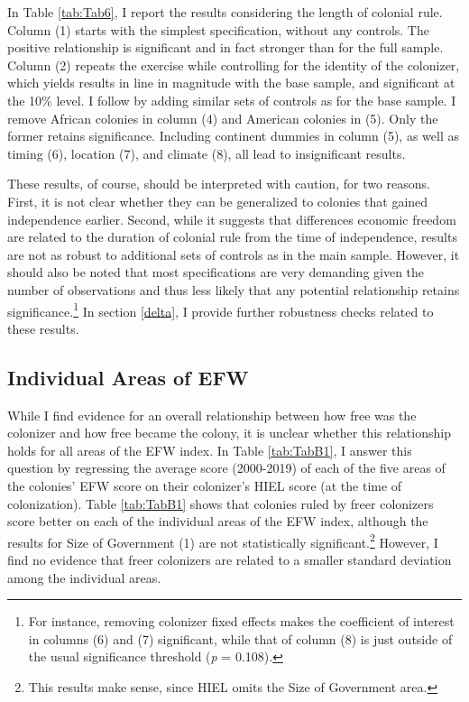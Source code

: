 \documentclass[a4paper,12pt]{article}
\begin{document}
In Table \ref{tab:Tab6}, I report the results considering the length of colonial rule. Column (1) starts with the simplest specification, without any controls. The positive relationship is significant and in fact stronger than for the full sample. Column (2) repeats the exercise while controlling for the identity of the colonizer, which yields results in line in magnitude with the base sample, and significant at the 10\% level. I follow by adding similar sets of controls as for the base sample. I remove African colonies in column (4) and American colonies in (5). Only the former retains significance. Including continent dummies in column (5), as well as timing (6), location (7), and climate (8), all lead to insignificant results. 

These results, of course, should be interpreted with caution, for two reasons. First, it is not clear whether they can be generalized to colonies that gained independence earlier. Second, while it suggests that differences economic freedom are related to the duration of colonial rule from the time of independence, results are not as robust to additional sets of controls as in the main sample. However, it should also be noted that most specifications are very demanding given the number of observations and thus less likely that any potential relationship retains significance.\footnote{For instance, removing colonizer fixed effects makes the coefficient of interest in columns (6) and (7) significant, while that of column (8) is just outside of the usual significance threshold (\textit{p} = 0.108).} In section \ref{delta}, I provide further robustness checks related to these results.

\subsection{Individual Areas of EFW}

While I find evidence for an overall relationship between how free was the colonizer and how free became the colony, it is unclear whether this relationship holds for all areas of the EFW index. In Table \ref{tab:TabB1}, I answer this question by regressing the average score (2000-2019) of each of the five areas of the colonies' EFW score on their colonizer's HIEL score (at the time of colonization). Table \ref{tab:TabB1} shows that colonies ruled by freer colonizers score better on each of the individual areas of the EFW index, although the results for Size of Government (1) are not statistically significant.\footnote{This results make sense, since HIEL omits the Size of Government area.} However, I find no evidence that freer colonizers are related to a smaller standard deviation among the individual areas.
\end{document}
